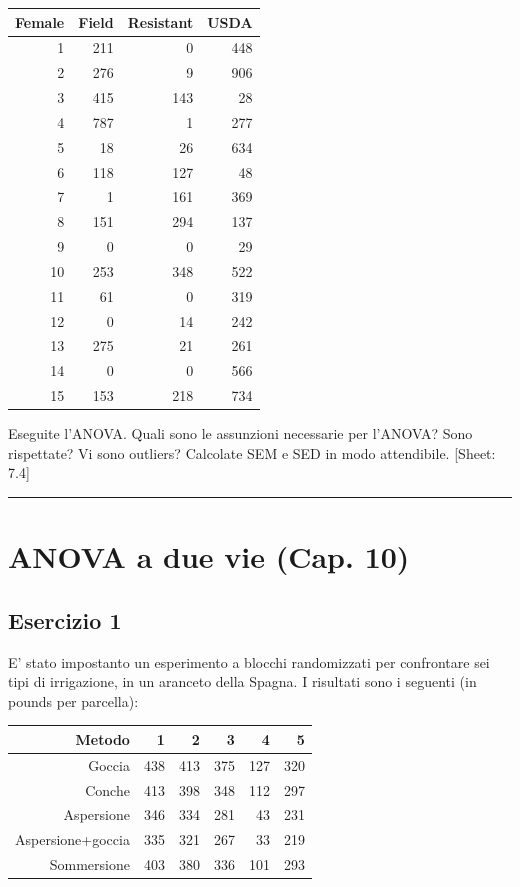 \documentclass[a4paper,12pt,oneside]{book}
\begin{document}
\begin{longtable}[]{@{}rrrr@{}}
\toprule()
Female & Field & Resistant & USDA \\
\midrule()
\endhead
1 & 211 & 0 & 448 \\
2 & 276 & 9 & 906 \\
3 & 415 & 143 & 28 \\
4 & 787 & 1 & 277 \\
5 & 18 & 26 & 634 \\
6 & 118 & 127 & 48 \\
7 & 1 & 161 & 369 \\
8 & 151 & 294 & 137 \\
9 & 0 & 0 & 29 \\
10 & 253 & 348 & 522 \\
11 & 61 & 0 & 319 \\
12 & 0 & 14 & 242 \\
13 & 275 & 21 & 261 \\
14 & 0 & 0 & 566 \\
15 & 153 & 218 & 734 \\
\bottomrule()
\end{longtable}

Eseguite l'ANOVA. Quali sono le assunzioni necessarie per l'ANOVA? Sono rispettate? Vi sono outliers? Calcolate SEM e SED in modo attendibile.
{[}Sheet: 7.4{]}

\begin{center}\rule{0.5\linewidth}{0.5pt}\end{center}

\hypertarget{anova-a-due-vie-cap.-10}{%
\section{ANOVA a due vie (Cap. 10)}\label{anova-a-due-vie-cap.-10}}

\hypertarget{esercizio-1-6}{%
\subsection{Esercizio 1}\label{esercizio-1-6}}

E' stato impostanto un esperimento a blocchi randomizzati per confrontare sei tipi di irrigazione, in un aranceto della Spagna. I risultati sono i seguenti (in pounds per parcella):

\begin{longtable}[]{@{}rrrrrr@{}}
\toprule()
Metodo & 1 & 2 & 3 & 4 & 5 \\
\midrule()
\endhead
Goccia & 438 & 413 & 375 & 127 & 320 \\
Conche & 413 & 398 & 348 & 112 & 297 \\
Aspersione & 346 & 334 & 281 & 43 & 231 \\
Aspersione+goccia & 335 & 321 & 267 & 33 & 219 \\
Sommersione & 403 & 380 & 336 & 101 & 293 \\
\bottomrule()
\end{longtable}
\end{document}

